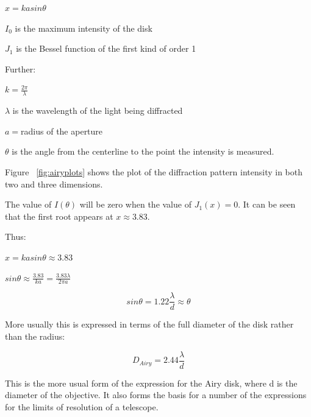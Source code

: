 \documentclass[11pt]{article}
\begin{document}
\Large
$x = kasin\theta$

$I_{0}$ \large is the maximum intensity of the disk 
\Large

$J_{1}$ \large is the Bessel function of the first kind of order 1


Further:

\Large
$k=\frac{2\pi}{\lambda}$

\large
$\lambda$ is the wavelength of the light being diffracted

$a=$\large radius of the aperture

$\theta$ is the angle from the centerline to the point the intensity is measured.

Figure ~\ref{fig:airyplots} shows the plot of the diffraction pattern intensity in both two and three dimensions.

The value of $I(\theta)$ will be zero when the value of $J_{1}(x) = 0$.  It can be seen that the first root appears at $x\approx3.83$.

Thus:

\large
$x = kasin\theta \approx 3.83$

$sin\theta\approx\frac{3.83}{ka}=\frac{3.83\lambda}{2\pi a}$

\begin{equation}
\label{eqn:airy-radius}
sin\theta = 1.22\frac{\lambda}{d} \approx \theta 
\end{equation}

More usually this is expressed in terms of the full diameter of the disk rather than the radius:

\begin{equation}
\label{eqn:airy-diameter}
D_{Airy} = 2.44\frac{\lambda}{d}
\end{equation}

\large
This is the more usual form of the expression for the Airy disk, where d is the diameter of the objective.  It also forms the basis for a number of the expressions for the limits of resolution of a telescope.
\end{document}
